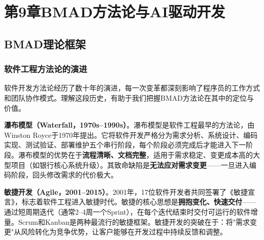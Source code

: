 
\chapter{第9章\quad BMAD方法论与AI驱动开发}


\section{BMAD理论框架}

\subsection{软件工程方法论的演进}

软件开发方法论经历了数十年的演进，每一次变革都深刻影响了程序员的工作方式和团队协作模式。理解这段历史，有助于我们把握BMAD方法论在其中的定位与价值。

\textbf{瀑布模型（Waterfall，1970s--1990s）}。瀑布模型是软件工程最早的方法论，由Winston Royce于1970年提出。它将软件开发严格分为需求分析、系统设计、编码实现、测试验证、部署维护五个串行阶段，每个阶段必须完成后才能进入下一阶段。瀑布模型的优势在于\textbf{流程清晰、文档完整}，适用于需求稳定、变更成本高的大型项目（如银行核心系统升级）。其致命缺陷是\textbf{无法应对需求变更}——一旦进入编码阶段，回头修改需求的代价极大。

\textbf{敏捷开发（Agile，2001--2015）}。2001年，17位软件开发者共同签署了《敏捷宣言》，标志着软件工程进入敏捷时代。敏捷的核心思想是\textbf{拥抱变化、快速交付}——通过短周期迭代（通常2--4周一个Sprint），在每个迭代结束时交付可运行的软件增量。Scrum和Kanban是两种最流行的敏捷框架。敏捷开发的突破在于：将"需求变更"从风险转化为竞争优势，让客户能够在开发过程中持续反馈和调整。

